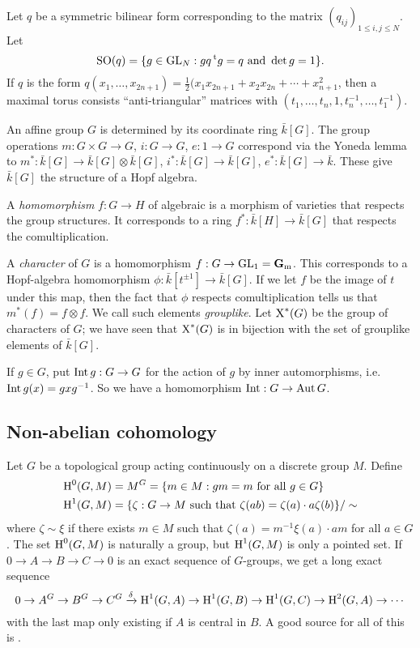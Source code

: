\begin{example}
Let $q$ be a symmetric bilinear form corresponding to the matrix 
$(q_{i j})_{1\leqslant i,j\leqslant N}$. Let 
\[
  \operatorname{SO}(q) = \{g\in \operatorname{GL}_N: g q \prescript{\mathrm{t}}{}{g} = q\text{ and }\det g=1\} .
\]
If $q$ is the form 
$q(x_1,\dots,x_{2n+1}) = \frac 1 2 (x_1 x_{2n+1} + x_2 x_{2n} + \cdots + x_{n+1}^2$, 
then a maximal torus consists ``anti-triangular'' matrices with 
$(t_1,\dots,t_n,1,t_n^{-1},\dots,t_1^{-1})$. 
\end{example}

An affine group $G$ is determined by its coordinate ring $\bar k[G]$. The 
group operations $m:G\times G\to G$, $i:G\to G$, $e:1\to G$ correspond via 
the Yoneda lemma to $m^\ast:\bar k[G]\to \bar k[G]\otimes \bar k[G]$, 
$i^\ast:\bar k[G] \to \bar k[G]$, $e^\ast:\bar k[G] \to \bar k$. These give 
$\bar k[G]$ the structure of a Hopf algebra. 

A \emph{homomorphism} $f:G\to H$ of algebraic is a morphism of varieties that 
respects the group structures. It corresponds to a ring 
$f^\ast:\bar k[H] \to \bar k[G]$ that respects the comultiplication.

A \emph{character} of $G$ is a homomorphism 
$f:G\to \operatorname{GL}_1 = \mathbf{G}_{\mathrm{m}}$. This corresponds to a 
Hopf-algebra homomorphism $\phi:\bar k[t^{\pm 1}] \to \bar k[G]$. If we let $f$ 
be the image of $t$ under this map, then the fact that $\phi$ respects 
comultiplication tells us that $m^\ast(f) = f\otimes f$. We call such 
elements \emph{grouplike}. Let $\operatorname{X}^\ast(G)$ be the group of characters 
of $G$; we have seen that $\operatorname{X}^\ast(G)$ is in bijection with the set 
of grouplike elements of $\bar k[G]$. 

If $g\in G$, put $\operatorname{Int} g:G\to G$ for the action of $g$ by inner 
automorphisms, i.e.\ $\operatorname{Int} g(x) = g x g^{-1}$. So we have a homomorphism 
$\operatorname{Int}:G\to \operatorname{Aut} G$. 





\subsection{Non-abelian cohomology}

Let $G$ be a topological group acting continuously on a discrete group $M$. 
Define 
\begin{align*}
  \operatorname{H}^0(G,M) &= M^G = \{m\in M:g m=m\text{ for all }g\in G\} \\
  \operatorname{H}^1(G,M) &= \{\zeta:G\to M\text{ such that }\zeta(a b) = \zeta(a)\cdot a \zeta(b)\} / \sim 
\end{align*}
where $\zeta\sim \xi$ if there exists $m\in M$ such that 
$\zeta(a) = m^{-1} \xi(a) \cdot a m$ for all $a\in G$. The set $\operatorname{H}^0(G,M)$ is 
naturally a group, but $\operatorname{H}^1(G,M)$ is only a pointed set. If 
$0 \to A \to B \to C \to 0$ is an exact sequence of $G$-groups, we get a long 
exact sequence 
\[
  0 \to A^G \to B^G \to C^G \xrightarrow\delta \operatorname{H}^1(G,A) \to \operatorname{H}^1(G,B) \to \operatorname{H}^1(G,C) \to \operatorname{H}^2(G,A) \to \cdots 
\]
with the last map only existing if $A$ is central in $B$. A good source for all 
of this is \cite{s79}. 

